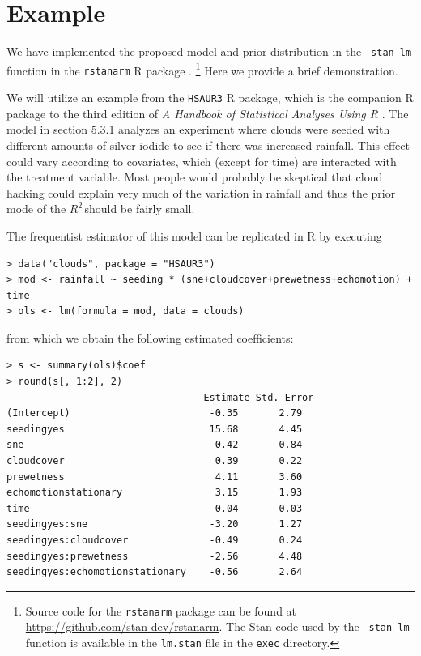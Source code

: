 \documentclass[11pt]{article}
\newcommand{\Rsq}{$R^2\,$}
\begin{document}
\section{Example}
\label{sec:example}


We have implemented the proposed model and prior distribution in the {\tt
stan\_lm} function in the {\tt rstanarm} R package \cite{rstanarm}.%
\footnote{Source code for the {\tt rstanarm} package can be found at
\url{https://github.com/stan-dev/rstanarm}. The Stan code used by the {\tt
stan\_lm} function is available in the {\tt lm.stan} file in the {\tt exec}
directory.}
Here we provide a brief demonstration.

We will utilize an example from the {\tt HSAUR3} R package, which is the
companion R package to the third edition of \emph{A Handbook of Statistical
Analyses Using R} \cite{HSAUR3-book}. The model in section 5.3.1 analyzes an
experiment where clouds were seeded with different amounts of silver iodide to
see if there was increased rainfall. This effect could vary according to
covariates, which (except for time) are interacted with the treatment variable.
Most people would probably be skeptical that cloud hacking could explain very
much of the variation in rainfall and thus the prior mode of the \Rsq should be
fairly small.

The frequentist estimator of this model can be replicated in R by executing

\vspace{.5cm}
\begin{lstlisting}[frame=lines]
> data("clouds", package = "HSAUR3")
> mod <- rainfall ~ seeding * (sne+cloudcover+prewetness+echomotion) + time
> ols <- lm(formula = mod, data = clouds)
\end{lstlisting}
\vspace{.5cm}

\noindent from which we obtain the following estimated coefficients:

\vspace{.5cm}
\begin{lstlisting}[frame=lines]
> s <- summary(ols)$coef
> round(s[, 1:2], 2)
                                  Estimate Std. Error
(Intercept)                        -0.35       2.79
seedingyes                         15.68       4.45
sne                                 0.42       0.84
cloudcover                          0.39       0.22
prewetness                          4.11       3.60
echomotionstationary                3.15       1.93
time                               -0.04       0.03
seedingyes:sne                     -3.20       1.27
seedingyes:cloudcover              -0.49       0.24
seedingyes:prewetness              -2.56       4.48
seedingyes:echomotionstationary    -0.56       2.64
\end{lstlisting}
\vspace{.5cm}
\end{document}

